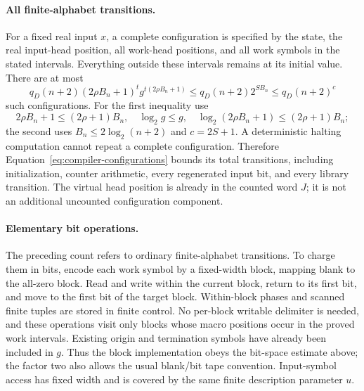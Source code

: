 \paragraph{All finite-alphabet transitions.}
For a fixed real input $x$, a complete configuration is specified by
the state, the real input-head position, all work-head positions, and
all work symbols in the stated intervals.  Everything outside these
intervals remains at its initial value.  There are at most
\begin{equation}\label{eq:compiler-configurations}
 q_D(n+2)(2\rho B_n+1)^t
       g^{t(2\rho B_n+1)}
 \le q_D(n+2)2^{SB_n}
 \le q_D(n+2)^c
\end{equation}
such configurations.  For the first inequality use
\[
 2\rho B_n+1\le(2\rho+1)B_n,
 \quad \log_2g\le g,
 \quad \log_2(2\rho B_n+1)\le(2\rho+1)B_n;
\]
the second uses $B_n\le2\log_2(n+2)$ and $c=2S+1$.
A deterministic halting computation cannot repeat a complete
configuration.  Therefore Equation~\eqref{eq:compiler-configurations}
bounds its total transitions, including initialization, counter
arithmetic, every regenerated input bit, and every library transition.
The virtual head position is already in the counted word $J$; it is
not an additional uncounted configuration component.

\paragraph{Elementary bit operations.}
The preceding count refers to ordinary finite-alphabet transitions.
To charge them in bits, encode each work symbol by a fixed-width block,
mapping blank to the all-zero block.  Read and write within the current
block, return to its first bit, and move to the first bit of the target
block.  Within-block phases and scanned finite tuples are stored in
finite control.  No per-block writable delimiter is needed, and these
operations visit only blocks whose macro positions occur in the proved
work intervals.  Existing origin and termination symbols have already
been included in $g$.  Thus the block implementation obeys the bit-space
estimate above; the factor two also allows the usual blank/bit tape
convention.  Input-symbol access has fixed width and is covered by the
same finite description parameter $u$.

